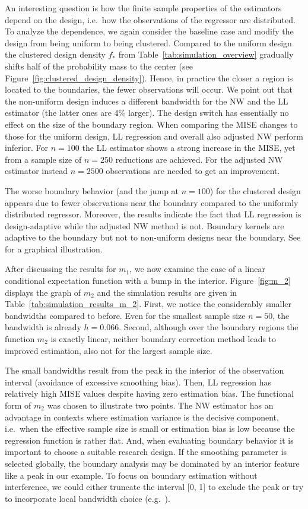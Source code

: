An interesting question is how the finite sample properties of the estimators depend on the design,
i.e.\ how the observations of the regressor are distributed.
To analyze the dependence, we again consider the baseline case and modify the design from being uniform to being clustered.
Compared to the uniform design the clustered design density $f_{\ast}$ from Table~\ref{tab:simulation_overview} gradually shifts half of the probability mass to the center (see Figure~\ref{fig:clustered_design_density}).
Hence, in practice the closer a region is located to the boundaries, the fewer observations will occur.
We point out that the non-uniform design induces a different bandwidth for the NW and the LL estimator (the latter ones are 4\% larger).
The design switch has essentially no effect on the size of the boundary region.
When comparing the MISE changes to those for the uniform design,
LL regression and overall also adjusted NW perform inferior.
For $n = 100$ the LL estimator shows a strong increase in the MISE, yet from a sample size of $n = 250$ reductions are achieved.
For the adjusted NW estimator instead $n = 2500$ observations are needed to get an improvement.

The worse boundary behavior (and the jump at $n = 100$) for the clustered design appears due to fewer observations near the boundary compared to the uniformly distributed regressor.
Moreover, the results indicate the fact that LL regression is design-adaptive while the adjusted NW method is not.
Boundary kernels are adaptive to the boundary but not to non-uniform designs near the boundary.
See \textcite{Hastie_1993} for a graphical illustration.

After discussing the results for $m_1$, we now examine the case of a linear conditional expectation function with a bump in the interior.
Figure~\ref{fig:m_2} displays the graph of $m_2$ and the simulation results are given in Table~\ref{tab:simulation_results_m_2}.
First, we notice the considerably smaller bandwidths compared to before.
Even for the smallest sample size $n = 50$, the bandwidth is already $h = 0.066$.
Second, although over the boundary regions the function $m_2$ is exactly linear,
neither boundary correction method leads to improved estimation, also not for the largest sample size.

The small bandwidths result from the peak in the interior of the observation interval (avoidance of excessive smoothing bias).
Then, LL regression has relatively high MISE values despite having zero estimation bias.
The functional form of $m_2$ was chosen to illustrate two points.
The NW estimator has an advantage in contexts where estimation variance is the decisive component,
i.e.\ when the effective sample size is small or estimation bias is low because the regression function is rather flat.
And, when evaluating boundary behavior it is important to choose a suitable research design.
If the smoothing parameter is selected globally, the boundary analysis may be dominated by an interior feature like a peak in our example.
To focus on boundary estimation without interference, we could either truncate the interval [0, 1] to exclude the peak
or try to incorporate local bandwidth choice (e.g.\ \cite{Fan_Gijbels_1992}).    

